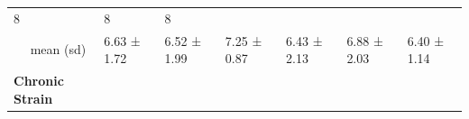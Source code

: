\documentclass[
  english,
  man,floatsintext]{apa6}
\begin{document}
\begin{longtable}[]{@{}lllllll@{}}
\begin{minipage}[t]{0.11\columnwidth}
8\strut
\end{minipage} & \begin{minipage}[t]{0.11\columnwidth}\raggedright
8\strut
\end{minipage} & \begin{minipage}[t]{0.11\columnwidth}\raggedright
8\strut
\end{minipage}\tabularnewline
\begin{minipage}[t]{0.16\columnwidth}\raggedright
~~ mean (sd)\strut
\end{minipage} & \begin{minipage}[t]{0.11\columnwidth}\raggedright
6.63 ± 1.72\strut
\end{minipage} & \begin{minipage}[t]{0.11\columnwidth}\raggedright
6.52 ± 1.99\strut
\end{minipage} & \begin{minipage}[t]{0.11\columnwidth}\raggedright
7.25 ± 0.87\strut
\end{minipage} & \begin{minipage}[t]{0.11\columnwidth}\raggedright
6.43 ± 2.13\strut
\end{minipage} & \begin{minipage}[t]{0.11\columnwidth}\raggedright
6.88 ± 2.03\strut
\end{minipage} & \begin{minipage}[t]{0.11\columnwidth}\raggedright
6.40 ± 1.14\strut
\end{minipage}\tabularnewline
\begin{minipage}[t]{0.16\columnwidth}\raggedright
\textbf{Chronic Strain}\strut
\end{minipage} & \begin{minipage}[t]{0.11\columnwidth}\raggedright
~~\strut
\end{minipage} & \begin{minipage}[t]{0.11\columnwidth}\raggedright
~~\strut
\end{minipage} & \begin{minipage}[t]{0.11\columnwidth}\raggedright
~~\strut
\end{minipage} & \begin{minipage}[t]{0.11\columnwidth}\raggedright
~~\strut
\end{minipage} & \begin{minipage}[t]{0.11\columnwidth}\raggedright
~~\strut
\end{minipage} & \begin{minipage}[t]{0.11\columnwidth}\raggedright

\end{minipage}
\end{longtable}
\end{document}

